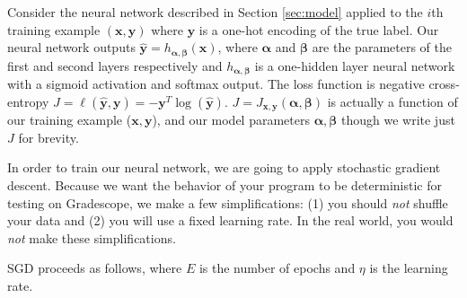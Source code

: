 \documentclass[11pt,addpoints,answers]{exam}
\newcommand{\xv}{\mathbf{x}}
\newcommand{\yv}{\mathbf{y}}
\newcommand{\alphav     }{\boldsymbol \alpha     }
\newcommand{\betav      }{\boldsymbol \beta      }
\begin{document}
Consider the neural network described in Section \ref{sec:model} applied to the $i$th training example $(\xv, \yv)$ where $\yv$ is a one-hot encoding of the true label. Our neural network outputs $\hat{\yv} = h_{\alphav, \betav}(\xv)$, where $\alphav$ and $\betav$ are the parameters of the first and second layers respectively and $h_{\alphav, \betav}$ is a one-hidden layer neural network with a sigmoid activation and softmax output. The loss function is negative cross-entropy $J = \ell(\hat{\yv}, \yv) = - \yv^T \log(\hat{\yv})$. $J = J_{\xv, \yv}(\alphav, \betav)$ is actually a function of our training example ($\xv, \yv$), and our model parameters $\alphav, \betav$ though we write just $J$ for brevity.

In order to train our neural network, we are going to apply stochastic gradient descent. Because we want the behavior of your program to be deterministic for testing on Gradescope, we make a few simplifications: (1) you should \emph{not} shuffle your data and (2) you will use a fixed learning rate. In the real world, you would \emph{not} make these simplifications. 

SGD proceeds as follows, where $E$ is the number of epochs and $\eta$ is the learning rate.
\end{document}
